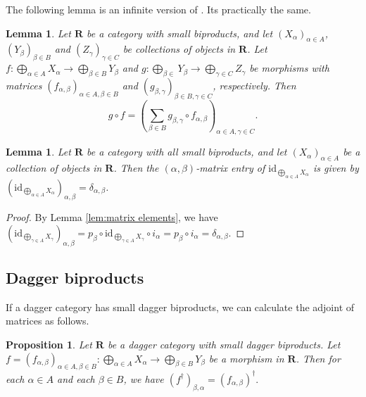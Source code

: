 \documentclass[12pt]{tac}
\newtheorem{lemma}[theorem]{Lemma}
\newtheorem{proposition}[theorem]{Proposition}
\theoremstyle{definition}
\theoremstyle{remark}
\newcommand{\<}{\langle}
\renewcommand{\>}{\rangle}
\renewcommand{\:}{\colon}
\newcommand{\id}{\mathrm{id}}
\begin{document}
The following lemma is an infinite version of \cite[Proposition 2.28]{heunenvicary}. Its practically the same.
\begin{lemma}\label{lem:matrix multiplication}
Let $\mathbf R$ be a category with small biproducts, and let $(X_{\alpha})_{\alpha\in A}$, $(Y_\beta)_{\beta\in B}$ and $(Z_\gamma)_{\gamma\in C}$ be collections of objects in $\mathbf R$. 
    Let $f:\bigoplus_{\alpha\in A}X_\alpha\to \bigoplus_{\beta\in B}Y_{\beta}$ and $g:\bigoplus_{\beta\in }Y_\beta\to \bigoplus_{\gamma\in C}Z_\gamma$ be morphisms with matrices $(f_{\alpha,\beta})_{\alpha\in A,\beta\in B}$ and $(g_{\beta,\gamma})_{\beta\in B,\gamma\in C}$, respectively. Then 
    \[ g\circ f=\left(\sum_{\beta\in B}g_{\beta,\gamma}\circ f_{\alpha,\beta}\right)_{\alpha\in A,\gamma\in C}.\]
    \end{lemma}



\begin{lemma}\label{lem:matrix identity}
    Let $\mathbf R$ be a category with all small biproducts, and let $(X_\alpha)_{\alpha\in A}$ be a collection of objects in $\mathbf R$. Then the $(\alpha,\beta)$-matrix entry of $\id_{\bigoplus_{\alpha\in A}X_\alpha}$ is given by 
   $(\id_{\bigoplus_{\alpha\in A}X_\alpha})_{\alpha,\beta}=\delta_{\alpha,\beta}$.
\end{lemma}
\begin{proof}
    By Lemma \ref{lem:matrix elements}, we have $(\id_{\bigoplus_{\gamma\in A}X_\gamma})_{\alpha,\beta}=p_{\beta}\circ\id_{\bigoplus_{\gamma\in A}X_\gamma}\circ i_{\alpha}=p_{\beta}\circ i_{\alpha}=\delta_{\alpha,\beta}$.
\end{proof}


\subsection{Dagger biproducts}

 
If a dagger category has small dagger biproducts, we can calculate the adjoint of matrices as follows.

\begin{proposition}\label{prop:dagger of matrix}
    Let $\mathbf R$ be a dagger category with small dagger biproducts. Let $f=(f_{\alpha,\beta})_{\alpha\in A,\beta\in B}:\bigoplus_{\alpha\in A}X_\alpha\to\bigoplus_{\beta\in B}Y_\beta$ be a morphism in $\mathbf R$. Then for each $\alpha\in A$ and each $\beta\in B$, we have
    $(f^\dag)_{\beta,\alpha}=(f_{\alpha,\beta})^\dag.$
\end{proposition}
\end{document}
